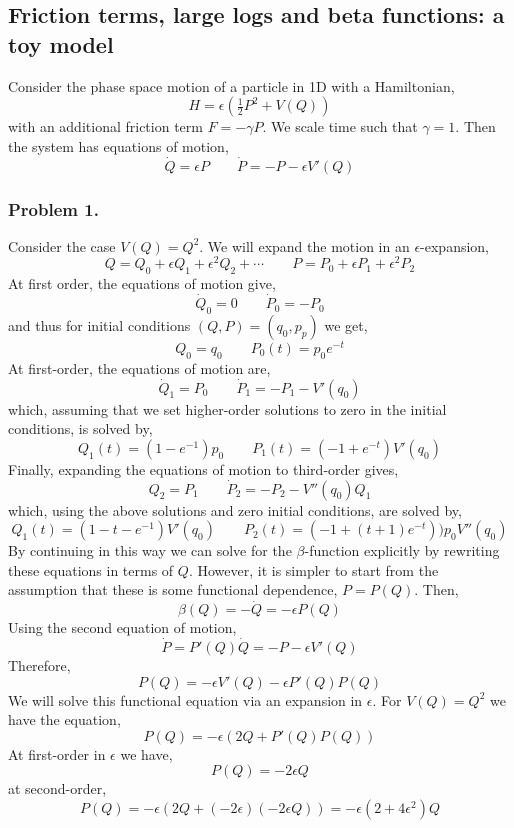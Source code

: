 \documentclass[12pt]{article}
\begin{document}
\subsection{Friction terms, large logs and beta functions: a toy model}

Consider the phase space motion of a particle in 1D with a Hamiltonian,
\[ H = \epsilon (\tfrac{1}{2} P^2 + V(Q)) \]
with an additional friction term $F = - \gamma P$. We scale time such that $\gamma = 1$. Then the system has equations of motion,
\[ \dot{Q} = \epsilon P \quad \quad \dot{P} = - P - \epsilon V'(Q) \]

\subsubsection{Problem 1.}

Consider the case $V(Q) = Q^2$. We will expand the motion in an $\epsilon$-expansion,
\[ Q = Q_0 + \epsilon Q_1 + \epsilon^2 Q_2 + \cdots \quad \quad P = P_0 + \epsilon P_1 + \epsilon^2 P_2 \]
At first order, the equations of motion give,
\[ \dot{Q}_0 = 0 \quad \quad \dot{P}_0 = - P_0 \]
and thus for initial conditions $(Q, P) = (q_0, p_p)$ we get,
\[ Q_0 = q_0 \quad \quad P_0(t) = p_0 e^{-t} \]
At first-order, the equations of motion are,
\[ \dot{Q}_1 = P_0 \quad \quad \dot{P}_1 = - P_1 - V'(q_0) \]
which, assuming that we set higher-order solutions to zero in the initial conditions, is solved by,
\[ Q_1(t) = (1 - e^{-1}) p_0 \quad \quad P_1(t) = (-1 + e^{-t}) V'(q_0) \]
Finally, expanding the equations of motion to third-order gives,
\[Q_2 = P_1 \quad \quad \dot{P}_2 = - P_2 - V''(q_0) Q_1 \]
which, using the above solutions and zero initial conditions, are solved by,
\[ Q_1(t) = (1 - t - e^{-1}) V'(q_0) \quad \quad P_2(t) = (-1 + (t + 1)e^{-t})) p_0 V''(q_0) \]
By continuing in this way we can solve for the $\beta$-function explicitly by rewriting these equations in terms of $Q$. However, it is simpler to start from the assumption that these is some functional dependence, $P = P(Q)$. Then,
\[ \beta(Q) = - \dot{Q} = - \epsilon P(Q) \]
Using the second equation of motion,
\[ \dot{P} = P'(Q) \dot{Q} = - P - \epsilon V'(Q) \] 
Therefore,
\[ P(Q) = - \epsilon V'(Q) - \epsilon P'(Q) P(Q) \]
We will solve this functional equation via an expansion in $\epsilon$. For $V(Q) = Q^2$ we have the equation,
\[ P(Q) = - \epsilon \left( 2 Q + P'(Q) P(Q) \right) \]
At first-order in $\epsilon$ we have,
\[ P(Q) = -2 \epsilon Q \]
at second-order,
\[ P(Q) = -\epsilon (2 Q + (-2 \epsilon)(-2\epsilon Q)) = - \epsilon(2 + 4 \epsilon^2) Q \]
\end{document}
